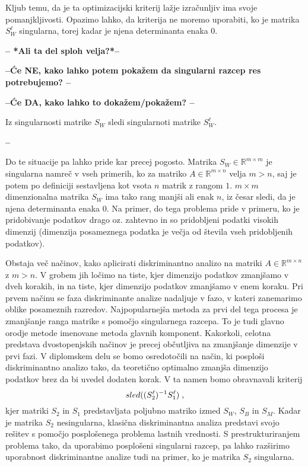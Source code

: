 \documentclass[mat1]{article}
\begin{document}
Kljub temu, da je ta optimizacijski kriterij lažje izračunljiv ima svoje pomanjkljivosti. Opazimo lahko, da kriterija ne moremo uporabiti, ko je matrika $S_W^\ell$ singularna, torej kadar je njena determinanta enaka 0. 

\textbf{-- *Ali ta del sploh velja?*--}

\textbf{--Će NE, kako lahko potem pokažem da singularni razcep res potrebujemo? --}

\textbf{--Će DA, kako lahko to dokažem/pokažem? --}

Iz singularnosti matrike $S_W$ sledi singularnoti matrike $S_W^\ell$.

\textbf{--}

Do te situacije pa lahko pride kar precej pogosto. Matrika $S_W \in  \mathbb{R}^{m \times m}$ je singularna namreč v vseh primerih, ko za matriko $A \in  \mathbb{R}^{m \times n}$ velja $m > n$, saj je potem po definiciji sestavljena kot vsota $n$ matrik z rangom $1$. $m \times m$ dimenzionalna matrika $S_W$ ima tako rang manjši ali enak $n$, iz česar sledi, da je njena determinanta enaka 0.
Na primer, do tega problema pride v primeru, ko je pridobivanje podatkov drago oz. zahtevno in so pridobljeni podatki visokih dimenzij (dimenzija posameznega podatka je večja od števila vseh pridobljenih podatkov).

Obstaja več načinov, kako aplicirati diskriminantno analizo na matriki $A \in \mathbb{R}^{m \times n}$ z $m > n$. V grobem jih ločimo na tiste, kjer dimenzijo podatkov zmanjšamo v dveh korakih, in na tiste, kjer dimenzijo podatkov zmanjšamo v enem koraku. Pri prvem načinu se faza diskriminante analize nadaljuje v fazo, v kateri zanemarimo oblike posameznih razredov. Najpopularnejša metoda za prvi del tega procesa je zmanjšanje ranga matrike s pomočjo singularnega razcepa. To je tudi glavno orodje metode imenovane metoda glavnih komponent. Kakorkoli, celotna predstava dvostopenjskih načinov je precej občutljiva na zmanjšanje dimenzije v prvi fazi. V diplomskem delu se bomo osredotočili na način, ki posploši diskriminantno analizo tako, da teoretično optimalno zmanjša dimenzijo podatkov brez da bi uvedel dodaten korak. V ta namen bomo obravnavali kriterij 
$$ sled((S_2^\ell)^{-1} S_1^\ell) \hspace{1mm} \text{,}
$$
kjer matriki $S_2$ in $S_1$ predstavljata poljubno matriko izmed $S_W$, $S_B$ in $S_M$.  Kadar je matrika $S_2$ nesingularna, klasična diskriminantna analiza predstavi svojo rešitev s pomočjo posplošenega problema lastnih vrednosti. S prestrukturiranjem problema tako, da uporabimo posplošeni singularni razcep, pa lahko razširimo uporabnost diskriminantne analize tudi na primer, ko je matrika $S_2$ singularna.
\end{document}
